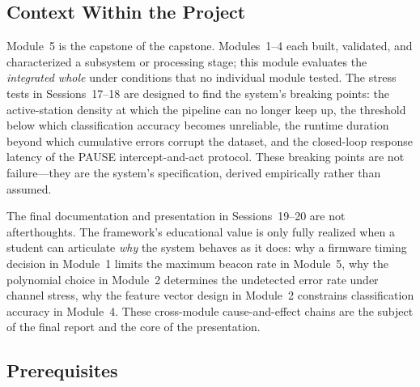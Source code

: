 \documentclass[11pt,letterpaper]{article}
\begin{document}
	\subsection{Context Within the Project}

	Module~5 is the capstone of the capstone. Modules~1--4 each built, validated, and characterized a subsystem or processing stage; this module evaluates the \emph{integrated whole} under conditions that no individual module tested. The stress tests in Sessions~17--18 are designed to find the system's breaking points: the active-station density at which the \FPGA{} pipeline can no longer keep up, the \SNR{} threshold below which classification accuracy becomes unreliable, the runtime duration beyond which cumulative errors corrupt the dataset, and the closed-loop response latency of the PAUSE intercept-and-act protocol. These breaking points are not failure---they are the system's specification, derived empirically rather than assumed.

	The final documentation and presentation in Sessions~19--20 are not afterthoughts. The framework's educational value is only fully realized when a student can articulate \emph{why} the system behaves as it does: why a firmware timing decision in Module~1 limits the maximum beacon rate in Module~5, why the \CRC{} polynomial choice in Module~2 determines the undetected error rate under channel stress, why the feature vector design in Module~2 constrains classification accuracy in Module~4. These cross-module cause-and-effect chains are the subject of the final report and the core of the presentation.

	\subsection{Prerequisites}
\end{document}
